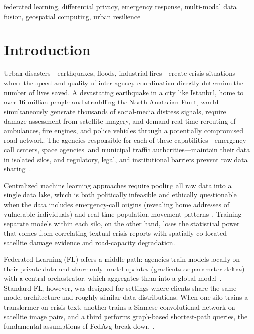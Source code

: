 \documentclass[conference]{IEEEtran}
\begin{document}
\begin{IEEEkeywords}
federated learning, differential privacy, emergency response, multi-modal data fusion, geospatial computing, urban resilience
\end{IEEEkeywords}

\section{Introduction}

Urban disasters---earthquakes, floods, industrial fires---create crisis situations where the speed and quality of inter-agency coordination directly determine the number of lives saved. A devastating earthquake in a city like Istanbul, home to over 16 million people and straddling the North Anatolian Fault, would simultaneously generate thousands of social-media distress signals, require damage assessment from satellite imagery, and demand real-time rerouting of ambulances, fire engines, and police vehicles through a potentially compromised road network. The agencies responsible for each of these capabilities---emergency call centers, space agencies, and municipal traffic authorities---maintain their data in isolated silos, and regulatory, legal, and institutional barriers prevent raw data sharing~\cite{b1}.

Centralized machine learning approaches require pooling all raw data into a single data lake, which is both politically infeasible and ethically questionable when the data includes emergency-call origins (revealing home addresses of vulnerable individuals) and real-time population movement patterns~\cite{b2}. Training separate models within each silo, on the other hand, loses the statistical power that comes from correlating textual crisis reports with spatially co-located satellite damage evidence and road-capacity degradation.

Federated Learning (FL) offers a middle path: agencies train models locally on their private data and share only model updates (gradients or parameter deltas) with a central orchestrator, which aggregates them into a global model~\cite{b3}. Standard FL, however, was designed for settings where clients share the same model architecture and roughly similar data distributions. When one silo trains a transformer on crisis text, another trains a Siamese convolutional network on satellite image pairs, and a third performs graph-based shortest-path queries, the fundamental assumptions of FedAvg break down~\cite{b4}.
\end{document}
